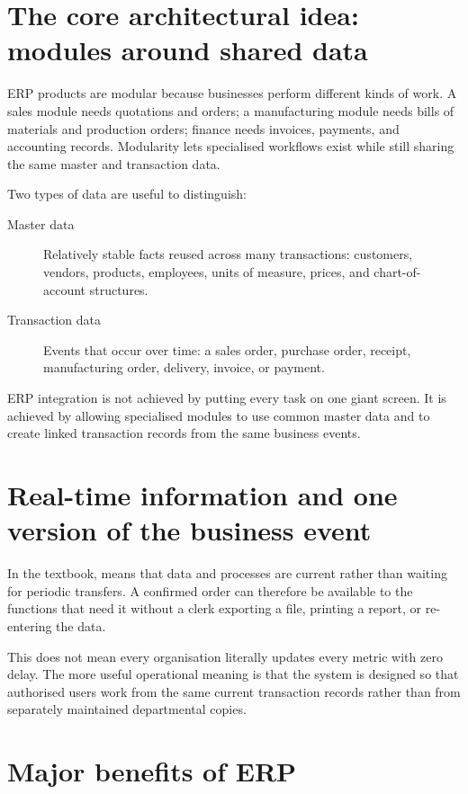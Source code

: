 \section{The core architectural idea: modules around shared data}

ERP products are modular because businesses perform different kinds of work. A sales module needs quotations and orders; a manufacturing module needs bills of materials and production orders; finance needs invoices, payments, and accounting records. Modularity lets specialised workflows exist while still sharing the same master and transaction data.

Two types of data are useful to distinguish:

\begin{description}
  \item[Master data] Relatively stable facts reused across many transactions: customers, vendors, products, employees, units of measure, prices, and chart-of-account structures.
  \item[Transaction data] Events that occur over time: a sales order, purchase order, receipt, manufacturing order, delivery, invoice, or payment.
\end{description}

\begin{keyidea}
ERP integration is not achieved by putting every task on one giant screen. It is achieved by allowing specialised modules to use common master data and to create linked transaction records from the same business events.
\end{keyidea}

\section{Real-time information and one version of the business event}

In the textbook,  means that data and processes are current rather than waiting for periodic transfers. A confirmed order can therefore be available to the functions that need it without a clerk exporting a file, printing a report, or re-entering the data.

This does not mean every organisation literally updates every metric with zero delay. The more useful operational meaning is that the system is designed so that authorised users work from the same current transaction records rather than from separately maintained departmental copies.

\section{Major benefits of ERP}

